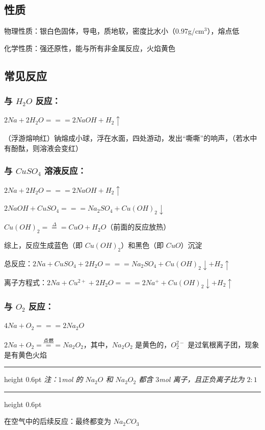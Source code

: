 \documentclass[UTF8,zihao=-4,openany]{ctexbook}
\newenvironment{notebox}
  {\par\smallskip\noindent\begingroup\begin{minipage}{\linewidth}\color{noteframe}\hrule height 0.6pt\smallskip\color{black}\itshape}
  {\par\smallskip\color{noteframe}\hrule height 0.6pt\end{minipage}\endgroup\par\smallskip}
\begin{document}
\subsection{性质}
物理性质：银白色固体，导电，质地软，密度比水小（$0.97$g/cm$^3$），熔点低\par

化学性质：强还原性，能与所有非金属反应，火焰黄色\par
\subsection{常见反应}
\subsubsection{与 $H_2O$ 反应：}
$2Na+2H_2O=\!=\!=2NaOH+H_2\uparrow$\par

（浮游熔响红）钠熔成小球，浮在水面，四处游动，发出“嘶嘶”的响声，（若水中有酚酞，则溶液会变红）\par
\subsubsection{与 $CuSO_4$ 溶液反应：}
$2Na+2H_2O=\!=\!=2NaOH+H_2\uparrow$\par

$2NaOH+CuSO_4=\!=\!=Na_2SO_4+Cu(OH)_2\downarrow$\par

$Cu(OH)_2\stackrel{\Delta}{=\!=\!=}CuO+H_2O$（前面的反应放热）\par

综上，反应生成蓝色（即 $Cu(OH)_2$）和黑色（即 $CuO$）沉淀\par

总反应：$2Na+CuSO_4+2H_2O=\!=\!=Na_2SO_4+Cu(OH)_2\downarrow+H_2\uparrow$\par

离子方程式：$2Na+Cu^{2+}+2H_2O=\!=\!=2Na^++Cu(OH)_2\downarrow+H_2\uparrow$\par
\subsubsection{与 $O_2$ 反应：}
$4Na+O_2=\!=\!=2Na_2O$\par

$2Na+O_2\stackrel{\mbox{点燃}}{=\!=\!=}Na_2O_2$，其中，$Na_2O_2$ 是黄色的，$O_2^{2-}$ 是过氧根离子团，现象是有黄色火焰\par
\begin{notebox}
注：$1$mol 的 $Na_2O$ 和 $Na_2O_2$ 都含 $3$mol 离子，且正负离子比为 $2:1$\par
\end{notebox}
在空气中的后续反应：最终都变为 $Na_2CO_3$\par
\end{document}
